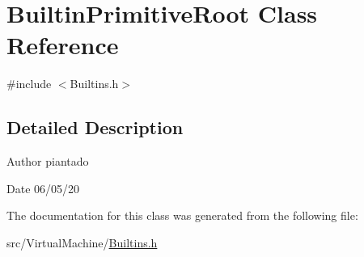 \hypertarget{class_builtin_primitive_root}{}\section{Builtin\+Primitive\+Root Class Reference}
\label{class_builtin_primitive_root}


{\ttfamily \#include $<$Builtins.\+h$>$}



\subsection{Detailed Description}
\begin{DoxyAuthor}{Author}
piantado 
\end{DoxyAuthor}
\begin{DoxyDate}{Date}
06/05/20 
\end{DoxyDate}


The documentation for this class was generated from the following file\+:\begin{DoxyCompactItemize}
\item 
src/\+Virtual\+Machine/\hyperlink{_builtins_8h}{Builtins.\+h}\end{DoxyCompactItemize}
